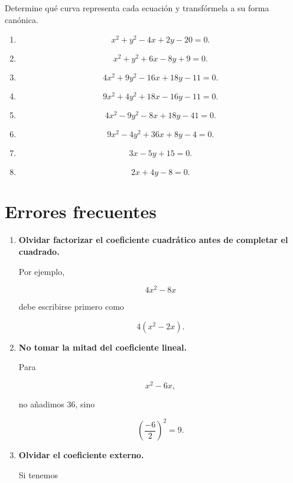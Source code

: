 \documentclass[12pt]{article}
\begin{document}
{Determine qué curva representa cada ecuación y transfórmela a su forma
canónica.

\begin{enumerate}

\item
\[
x^2+y^2-4x+2y-20=0.
\]

\item
\[
x^2+y^2+6x-8y+9=0.
\]

\item
\[
4x^2+9y^2-16x+18y-11=0.
\]

\item
\[
9x^2+4y^2+18x-16y-11=0.
\]

\item
\[
4x^2-9y^2-8x+18y-41=0.
\]

\item
\[
9x^2-4y^2+36x+8y-4=0.
\]

\item
\[
3x-5y+15=0.
\]

\item
\[
2x+4y-8=0.
\]

\end{enumerate}

\section{Errores frecuentes}

\begin{enumerate}

\item \textbf{Olvidar factorizar el coeficiente cuadrático antes de
completar el cuadrado.}

Por ejemplo,

\[
4x^2-8x
\]

debe escribirse primero como

\[
4(x^2-2x).
\]

\item \textbf{No tomar la mitad del coeficiente lineal.}

Para

\[
x^2-6x,
\]

no añadimos \(36\), sino

\[
\left(\frac{-6}{2}\right)^2=9.
\]

\item \textbf{Olvidar el coeficiente externo.}

Si tenemos


\end{enumerate}}
\end{document}

